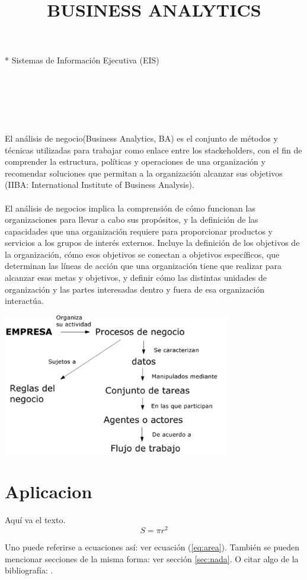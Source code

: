 *  Sistemas de Información Ejecutiva (EIS)
\\\\\\\\
\title{BUSINESS ANALYTICS}\\\\
El análisis de negocio(Business Analytics, BA) es el conjunto de métodos y técnicas utilizadas para trabajar como enlace entre los stackeholders, con el fin de comprender la estructura, políticas y operaciones de una organización y recomendar soluciones que permitan a la organización alcanzar sus objetivos (IIBA: International Institute of Business Analysis).\\\\
El análisis de negocios implica la comprensión de cómo funcionan las organizaciones para llevar a cabo sus propósitos, y la definición de las capacidades que una organización requiere para proporcionar productos y servicios a los grupos de interés externos. Incluye la definición de los objetivos de la organización, cómo esos objetivos se conectan a objetivos específicos, que determinan las líneas de acción que una organización tiene que realizar para alcanzar esas metas y objetivos, y definir cómo las distintas unidades de organización y las partes interesadas dentro y fuera de esa organización interactúa.


\begin{center}
\includegraphics[width=10cm]{./Imagenes/anegocios}
\end{center}
\newpage

\section{Aplicacion}
Aquí va el texto.
\begin{equation}\label{eq:area}
  S = \pi r^2
\end{equation}
\item{Uno puede referirse a ecuaciones así: ver ecuación (\ref{eq:area}).
También se pueden mencionar secciones de la misma forma: ver sección}
\ref{sec:nada}. O citar algo de la bibliografía: \cite{Cd94}.
